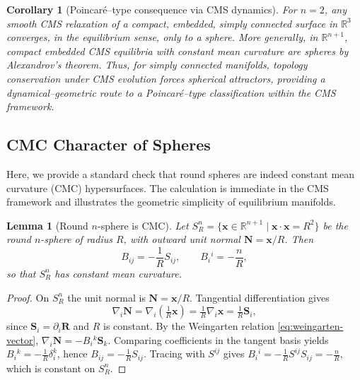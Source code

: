 \documentclass[11pt]{article}
\theoremstyle{definition}
\theoremstyle{plain}
\newtheorem{lemma}[definition]{Lemma}
\newtheorem{corollary}[definition]{Corollary}
\theoremstyle{remark}
\begin{document}
\begin{corollary}[Poincaré–type consequence via CMS dynamics]\label{cor:Poincare-CMS}
For $n=2$, any smooth CMS relaxation of a compact, embedded, simply connected surface in $\mathbb{R}^3$ converges, in the equilibrium sense, only to a sphere.  
More generally, in $\mathbb{R}^{n+1}$, compact embedded CMS equilibria with constant mean curvature are spheres by Alexandrov’s theorem.  
Thus, for simply connected manifolds, topology conservation under CMS evolution forces spherical attractors, providing a dynamical–geometric route to a Poincaré–type classification within the CMS framework.
\end{corollary}

\subsection{CMC Character of Spheres}

Here, we provide a standard check that round spheres are indeed constant mean curvature (CMC) hypersurfaces.  
The calculation is immediate in the CMS framework and illustrates the geometric simplicity of equilibrium manifolds.

\begin{lemma}[Round $n$-sphere is CMC]\label{lem:Sn-CMC}
Let $S^n_R=\{\mathbf{x}\in\mathbb{R}^{n+1}\mid \mathbf{x}\cdot\mathbf{x}=R^2\}$ be the round $n$-sphere of radius $R$, with outward unit normal $\mathbf{N}=\mathbf{x}/R$. Then
\begin{equation}\label{eq:Sn-B}
B_{ij} = -\frac{1}{R}S_{ij}, 
\qquad 
B_i{}^{i}=-\frac{n}{R},
\end{equation}
so that $S^n_R$ has constant mean curvature.
\end{lemma}

\begin{proof}
On $S^n_R$ the unit normal is $\mathbf{N}=\mathbf{x}/R$. Tangential differentiation gives
\[
\nabla_i \mathbf{N}
=\nabla_i \left(\tfrac{1}{R}\mathbf{x}\right)
=\tfrac{1}{R}\nabla_i \mathbf{x}
=\tfrac{1}{R}\mathbf{S}_i,
\]
since $\mathbf{S}_i=\partial_i\mathbf{R}$ and $R$ is constant.  
By the Weingarten relation \eqref{eq:weingarten-vector},
\(
\nabla_i \mathbf{N}=-B_i{}^{k}\mathbf{S}_k.
\)
Comparing coefficients in the tangent basis yields
\(B_i{}^{k}=-\tfrac{1}{R}\delta_i^{k}\),
hence \(B_{ij}=-\tfrac{1}{R}S_{ij}\).  
Tracing with $S^{ij}$ gives
\(
B_i{}^{i}=-\tfrac{1}{R}S^{ij}S_{ij}=-\tfrac{n}{R},
\)
which is constant on $S^n_R$.
\end{proof}
\end{document}
